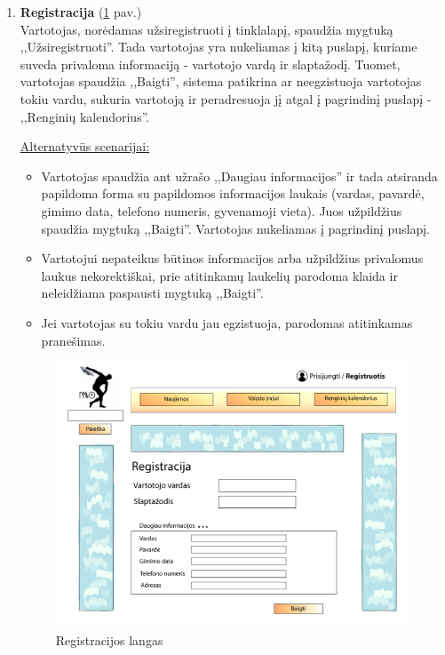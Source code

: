\documentclass{VUMIFPSkursinis}
\begin{document}
\begin{enumerate} [label = \textbf{U\arabic*.}]
			\item \textbf{Registracija} (\ref{fig:uzd_registruotis} pav.)\\
					Vartotojas, norėdamas užsiregistruoti į tinklalapį, spaudžia mygtuką ,,Užsiregistruoti''. Tada vartotojas yra nukeliamas į kitą puslapį, kuriame suveda privaloma informaciją - vartotojo vardą ir slaptažodį. Tuomet, vartotojas spaudžia ,,Baigti'', sistema patikrina ar neegzistuoja vartotojas tokiu vardu, sukuria vartotoją ir peradresuoja jį atgal į pagrindinį puslapį - ,,Renginių kalendorius''.
							
					\underline{Alternatyvūs scenarijai:}
					\begin{itemize}
						\item Vartotojas spaudžia ant užrašo ,,Daugiau informacijos'' ir tada atsiranda papildoma forma su papildomos informacijos laukais (vardas, pavardė, gimimo data, telefono numeris, gyvenamoji vieta). Juos užpildžius spaudžia mygtuką ,,Baigti''. Vartotojas nukeliamas į pagrindinį puslapį.
						\item Vartotojui nepateikus būtinos informacijos arba užpildžius privalomus laukus nekorektiškai, prie atitinkamų laukelių parodoma klaida ir neleidžiama paspausti mygtuką ,,Baigti''.
						\item Jei vartotojas su tokiu vardu jau egzistuoja, parodomas atitinkamas pranešimas.
					\end{itemize}

				\begin{figure}[H]
					\centering
					\includegraphics[width=\textwidth]{img/PSI4/registracija-01.jpg}
					\caption{Registracijos langas}
					\label{fig:uzd_registruotis}
				\end{figure}


\end{enumerate}
\end{document}
